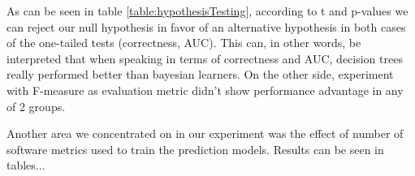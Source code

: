 As can be seen in table \ref{table:hypothesisTesting}, according to t and p-values we can reject our null hypothesis  in favor of an alternative hypothesis in both cases of the one-tailed tests (correctness, AUC). This can, in other words, be interpreted that when speaking in terms of correctness and AUC, decision trees really performed better than bayesian learners. On the other side, experiment with F-measure as evaluation metric didn't show performance advantage in any of 2 groups.

Another area we concentrated on in our experiment was the effect of number of software metrics used to train the prediction models. Results can be seen in tables...